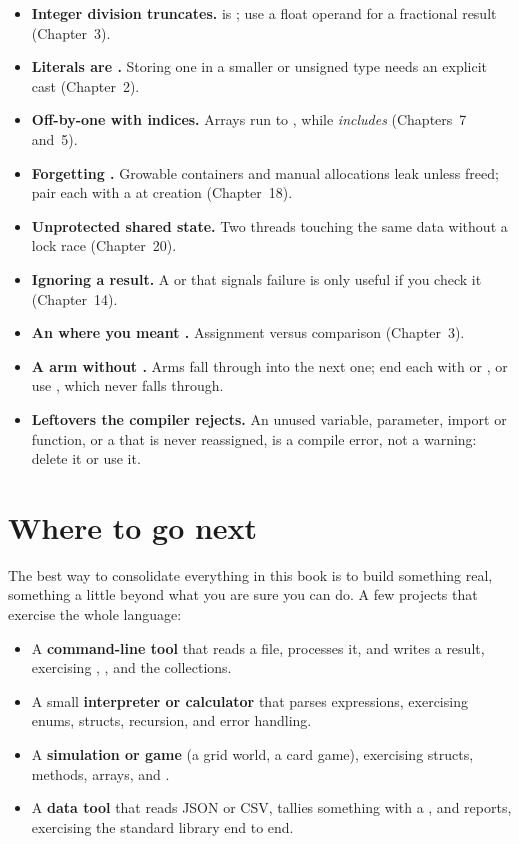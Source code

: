 \begin{itemize}[leftmargin=1.4em]
  \item \textbf{Integer division truncates.}  is ; use a float
        operand for a fractional result (Chapter~3).
  \item \textbf{Literals are .} Storing one in a smaller or unsigned type
        needs an explicit  cast (Chapter~2).
  \item \textbf{Off-by-one with indices.} Arrays run  to , while
         \emph{includes}  (Chapters~7 and~5).
  \item \textbf{Forgetting .} Growable containers and manual allocations
        leak unless freed; pair each with a  at creation
        (Chapter~18).
  \item \textbf{Unprotected shared state.} Two threads touching the same data
        without a lock race (Chapter~20).
  \item \textbf{Ignoring a result.} A  or  that signals
        failure is only useful if you check it (Chapter~14).
  \item \textbf{An \code{=} where you meant \code{==}.} Assignment versus
        comparison (Chapter~3).
  \item \textbf{A  arm without .} Arms fall through
        into the next one; end each with  or , or use
        , which never falls through.
  \item \textbf{Leftovers the compiler rejects.} An unused variable, parameter,
        import or function, or a  that is never reassigned, is a
        compile error, not a warning: delete it or use it.
\end{itemize}

\section{Where to go next}

The best way to consolidate everything in this book is to build something real,
something a little beyond what you are sure you can do. A few projects that exercise
the whole language:

\begin{itemize}[leftmargin=1.4em]
  \item A \textbf{command-line tool} that reads a file, processes it, and writes a
        result, exercising , , and the collections.
  \item A small \textbf{interpreter or calculator} that parses expressions,
        exercising enums, structs, recursion, and error handling.
  \item A \textbf{simulation or game} (a grid world, a card game), exercising
        structs, methods, arrays, and .
  \item A \textbf{data tool} that reads JSON or CSV, tallies something with a
        , and reports, exercising the standard library end to end.
\end{itemize}

